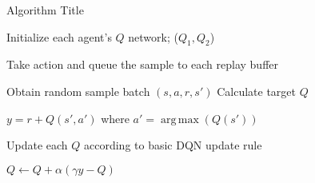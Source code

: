 \documentclass[a4paper,11pt]{article}
\DeclareMathOperator*{\argmax}{arg\,max}
\begin{document}
 
\begin{algorithm}
	\caption{Algorithm Title} 
	\begin{algorithmic}[1]
	
		\State Initialize each agent's $Q$ network; ($Q_1, Q_2$)
		
		
		
		\State Take action and queue the sample to each replay buffer
	
		\State Obtain random sample batch $(s,a,r,s')$
		\State Calculate target $Q$
		
		 \State \quad $y = r + Q(s', a')$ where $a' = \argmax(Q(s'))$ 
		 
		\State Update each $Q$ according to basic DQN update rule
		
		\State \quad $Q \leftarrow Q + \alpha( \gamma y - Q ) $
			
		\EndWhile
		
	\end{algorithmic} 
\end{algorithm}
\end{document}
